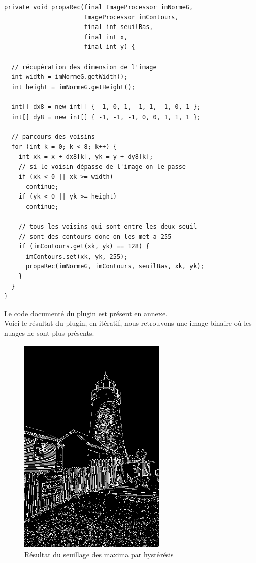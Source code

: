 \documentclass[a4paper,11pt]{article}
\begin{document}
  \begin{lstlisting}[caption=Fonction qui va déterminer si les contours entre les deux seuils sont corrects]
private void propaRec(final ImageProcessor imNormeG,
                      ImageProcessor imContours, 
                      final int seuilBas, 
                      final int x,
                      final int y) {

  // récupération des dimension de l'image
  int width = imNormeG.getWidth();
  int height = imNormeG.getHeight();

  int[] dx8 = new int[] { -1, 0, 1, -1, 1, -1, 0, 1 };
  int[] dy8 = new int[] { -1, -1, -1, 0, 0, 1, 1, 1 };

  // parcours des voisins
  for (int k = 0; k < 8; k++) {
    int xk = x + dx8[k], yk = y + dy8[k];
    // si le voisin dépasse de l'image on le passe
    if (xk < 0 || xk >= width)
      continue;
    if (yk < 0 || yk >= height)
      continue;

    // tous les voisins qui sont entre les deux seuil
    // sont des contours donc on les met a 255
    if (imContours.get(xk, yk) == 128) {
      imContours.set(xk, yk, 255);
      propaRec(imNormeG, imContours, seuilBas, xk, yk);
    }
  }
}
  \end{lstlisting}
  
  Le code documenté du plugin est présent en annexe.\\

  Voici le résultat du plugin, en itératif, nous retrouvons une image binaire où les nuages ne sont 
  plus présents.\\
  
  \begin{figure}[H]
  \center
   \includegraphics[width=7cm]{../canny_ite.png}
   \caption{Résultat du seuillage des maxima par hystérésis}
  \end{figure}
  
\end{document}
